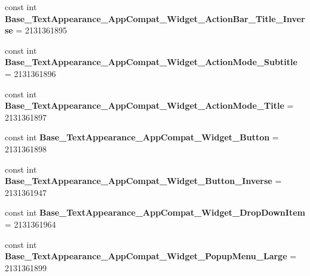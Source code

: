 \begin{DoxyCompactItemize}
\item 
\mbox{\label{class_sample_app_1_1_droid_1_1_resource_1_1_style_a288fb374c3c27d626569300a48fb0f63}} 
const int {\bfseries Base\+\_\+\+Text\+Appearance\+\_\+\+App\+Compat\+\_\+\+Widget\+\_\+\+Action\+Bar\+\_\+\+Title\+\_\+\+Inverse} = 2131361895
\item 
\mbox{\label{class_sample_app_1_1_droid_1_1_resource_1_1_style_a99432dd0bcb90d44487c3c749ab278db}} 
const int {\bfseries Base\+\_\+\+Text\+Appearance\+\_\+\+App\+Compat\+\_\+\+Widget\+\_\+\+Action\+Mode\+\_\+\+Subtitle} = 2131361896
\item 
\mbox{\label{class_sample_app_1_1_droid_1_1_resource_1_1_style_a9619e7a6001615b2742d6cc4a83841b0}} 
const int {\bfseries Base\+\_\+\+Text\+Appearance\+\_\+\+App\+Compat\+\_\+\+Widget\+\_\+\+Action\+Mode\+\_\+\+Title} = 2131361897
\item 
\mbox{\label{class_sample_app_1_1_droid_1_1_resource_1_1_style_a69a7c12104c31a448cd74b8336ce5cd9}} 
const int {\bfseries Base\+\_\+\+Text\+Appearance\+\_\+\+App\+Compat\+\_\+\+Widget\+\_\+\+Button} = 2131361898
\item 
\mbox{\label{class_sample_app_1_1_droid_1_1_resource_1_1_style_a8ccdb421b99e26d223fa59dc707225cc}} 
const int {\bfseries Base\+\_\+\+Text\+Appearance\+\_\+\+App\+Compat\+\_\+\+Widget\+\_\+\+Button\+\_\+\+Inverse} = 2131361947
\item 
\mbox{\label{class_sample_app_1_1_droid_1_1_resource_1_1_style_a857f7120791bca9ee53894c662b73f97}} 
const int {\bfseries Base\+\_\+\+Text\+Appearance\+\_\+\+App\+Compat\+\_\+\+Widget\+\_\+\+Drop\+Down\+Item} = 2131361964
\item 
\mbox{\label{class_sample_app_1_1_droid_1_1_resource_1_1_style_a1322d617027544ba3dba42f3028636d4}} 
const int {\bfseries Base\+\_\+\+Text\+Appearance\+\_\+\+App\+Compat\+\_\+\+Widget\+\_\+\+Popup\+Menu\+\_\+\+Large} = 2131361899

\end{DoxyCompactItemize}
